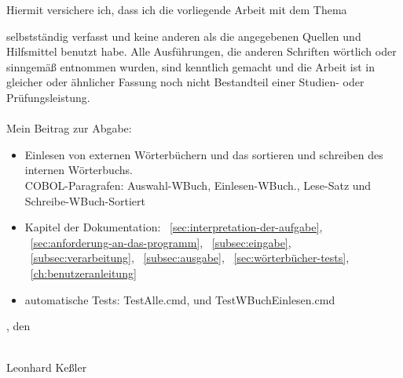 Hiermit versichere ich, dass ich die vorliegende Arbeit mit dem Thema
\begin{quote}
    \textit{\titleDocument}
\end{quote}
selbstständig verfasst und keine anderen als die angegebenen Quellen und Hilfsmittel benutzt habe.
Alle Ausführungen, die anderen Schriften wörtlich oder sinngemäß entnommen wurden, sind kenntlich gemacht und die Arbeit ist in gleicher oder ähnlicher Fassung noch nicht Bestandteil einer Studien- oder Prüfungsleistung.
\\
\\
Mein Beitrag zur Abgabe:
\begin{itemize}[noitemsep]
    \item Einlesen von externen Wörterbüchern und das sortieren und schreiben des internen Wörterbuchs.\\
    COBOL-Paragrafen: \glqq Auswahl-WBuch\grqq{},  \glqq Einlesen-WBuch.\grqq{},  \glqq Lese-Satz\grqq{} und \glqq Schreibe-WBuch-Sortiert\grqq{}
    \item Kapitel der Dokumentation: ~\ref{sec:interpretation-der-aufgabe}, ~\ref{sec:anforderung-an-das-programm}, ~\ref{subsec:eingabe}, ~\ref{subsec:verarbeitung}, ~\ref{subsec:ausgabe}, ~\ref{sec:wörterbücher-tests}, ~\ref{ch:benutzeranleitung}
    \item automatische Tests: TestAlle.cmd, und TestWBuchEinlesen.cmd
\end{itemize}
\vspace*{2cm}

\begingroup
\setlength{\parindent}{0pt} %

\locationDocument, den \dateDocument
\bigskip
\bigskip

\settowidth{\widthbox}{\locationDocument, den \dateDocument}

\makebox[\widthbox]{\hrulefill}\\
Leonhard Keßler
\endgroup